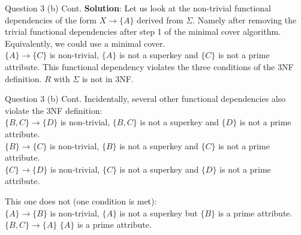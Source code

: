 \begin{frame}[fragile]{Question 3 (b) Cont.}
\textbf{Solution}:
Let us look at the non-trivial functional dependencies of the form $X \rightarrow \{A\}$ derived from $\Sigma$. Namely after removing the trivial functional dependencies after step 1 of the minimal cover algorithm. Equivalently, we could use a minimal cover.\\\vspace{3pt}
$\{A\} \rightarrow \{C\}$ is non-trivial, $\{A\}$ is not a superkey and $\{C\}$ is not a prime attribute. This functional dependency violates the three conditions of the 3NF definition. $R$ with $\Sigma$ is not in 3NF.\\\vspace{3pt}

\end{frame}

\begin{frame}[fragile]{Question 3 (b) Cont.}
Incidentally, several other functional dependencies also violate the 3NF definition:\\

$\{B, C\} \rightarrow \{D\}$ is non-trivial, $\{B, C\}$ is not a superkey and $\{D\}$ is not a prime attribute.\\
$\{B\} \rightarrow \{C\}$ is non-trivial, $\{B\}$ is not a superkey and $\{C\}$ is not a prime attribute.\\
$\{C\} \rightarrow \{D\}$ is non-trivial, $\{C\}$ is not a superkey and $\{D\}$ is not a prime attribute.\\\vspace{3pt}

This one does not (one condition is met):\\
$\{A\} \rightarrow \{B\}$ is non-trivial, $\{A\}$ is not a superkey but $\{B\}$ is a prime attribute.\\\vspace{3pt}
$\{B, C\} \rightarrow \{A\}$ $\{A\}$ is a prime attribute.\\\vspace{3pt}

\end{frame}

